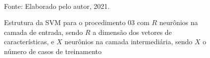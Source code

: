 \begin{figure}
	\centering
	\caption{Estrutura da SVM para o procedimento 03 com $R$ neurônios na camada de entrada, sendo $R$ a dimensão dos vetores de características, e $X$ neurônios na camada intermediária, sendo $X$ o número de casos de treinamento}
	\scalebox{1.8}{
		
	}
	\label{fig:3layersSVM}
	\\Fonte: Elaborado pelo autor, 2021.
\end{figure} 